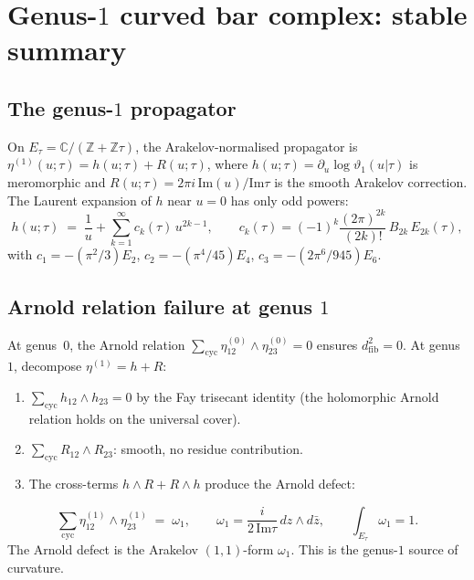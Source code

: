 \documentclass[11pt]{article}
\newcommand{\C}{\mathbb{C}}
\newcommand{\Z}{\mathbb{Z}}
\newcommand{\dfib}{d_{\mathrm{fib}}}
\begin{document}
\section{Genus-$1$ curved bar complex: stable summary}
\label{sec:genus1-bar-stable}
%

\subsection*{The genus-$1$ propagator}

On $E_\tau = \C/(\Z + \Z\tau)$, the Arakelov-normalised
propagator is $\eta^{(1)}(u;\tau) = h(u;\tau) + R(u;\tau)$, where
$h(u;\tau) = \partial_u\log\vartheta_1(u|\tau)$ is meromorphic
and $R(u;\tau) = 2\pi i\,\mathrm{Im}(u)/\mathrm{Im}\tau$ is the
smooth Arakelov correction.  The Laurent expansion of $h$ near
$u = 0$ has only odd powers:
\[
h(u;\tau)
\;=\;
\frac{1}{u}
+ \sum_{k=1}^{\infty} c_k(\tau)\,u^{2k-1},
\qquad
c_k(\tau) = (-1)^k\frac{(2\pi)^{2k}}{(2k)!}\,B_{2k}\,E_{2k}(\tau),
\]
with $c_1 = -(\pi^2/3)E_2$, $c_2 = -(\pi^4/45)E_4$,
$c_3 = -(2\pi^6/945)E_6$.

\subsection*{Arnold relation failure at genus $1$}

At genus~$0$, the Arnold relation
$\sum_{\mathrm{cyc}}\eta^{(0)}_{12}\wedge\eta^{(0)}_{23} = 0$
ensures $\dfib^2 = 0$.  At genus~$1$, decompose $\eta^{(1)} = h + R$:
\begin{enumerate}[label=(\alph*)]
\item $\sum_{\mathrm{cyc}} h_{12}\wedge h_{23} = 0$ by the Fay
  trisecant identity (the holomorphic Arnold relation holds on the
  universal cover).
\item $\sum_{\mathrm{cyc}} R_{12}\wedge R_{23}$: smooth, no
  residue contribution.
\item The cross-terms $h\wedge R + R\wedge h$ produce the Arnold
  defect:
\end{enumerate}
\[
\sum_{\mathrm{cyc}}
\eta^{(1)}_{12}\wedge\eta^{(1)}_{23}
\;=\;
\omega_1,
\qquad
\omega_1
= \frac{i}{2\,\mathrm{Im}\tau}\,dz\wedge d\bar{z},
\qquad
\textstyle\int_{E_\tau}\omega_1 = 1.
\]
The Arnold defect is the Arakelov $(1,1)$-form
$\omega_1$.  This is the genus-$1$ source of curvature.
\end{document}
